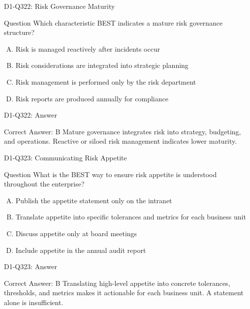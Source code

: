 \documentclass{beamer}
\begin{document}
\begin{frame}{D1-Q322: Risk Governance Maturity}
	\begin{block}{Question}
		Which characteristic BEST indicates a mature risk governance structure?
	\end{block}
	\begin{enumerate}[(A)]
		\item Risk is managed reactively after incidents occur
		\item Risk considerations are integrated into strategic planning
		\item Risk management is performed only by the risk department
		\item Risk reports are produced annually for compliance
	\end{enumerate}
\end{frame}
\begin{frame}{D1-Q322: Answer}
	\begin{block}{Correct Answer: B}
		Mature governance integrates risk into strategy, budgeting, and operations. Reactive or siloed risk management indicates lower maturity.
	\end{block}
\end{frame}

\begin{frame}{D1-Q323: Communicating Risk Appetite}
	\begin{block}{Question}
		What is the BEST way to ensure risk appetite is understood throughout the enterprise?
	\end{block}
	\begin{enumerate}[(A)]
		\item Publish the appetite statement only on the intranet
		\item Translate appetite into specific tolerances and metrics for each business unit
		\item Discuss appetite only at board meetings
		\item Include appetite in the annual audit report
	\end{enumerate}
\end{frame}
\begin{frame}{D1-Q323: Answer}
	\begin{block}{Correct Answer: B}
		Translating high-level appetite into concrete tolerances, thresholds, and metrics makes it actionable for each business unit. A statement alone is insufficient.
	\end{block}
\end{frame}
\end{document}
